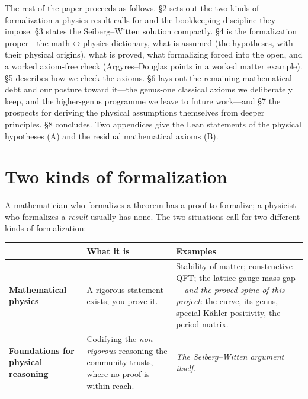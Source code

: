\documentclass{article}
\theoremstyle{plain}
\theoremstyle{definition}
\numberwithin{equation}{section}
\begin{document}
The rest of the paper proceeds as follows. \S2 sets out the two kinds of formalization a physics
result calls for and the bookkeeping discipline they impose. \S3 states the Seiberg--Witten solution
compactly. \S4 is the formalization proper---the math$\leftrightarrow$physics dictionary, what is assumed (the
hypotheses, with their physical origins), what is proved, what formalizing forced into the open, and a worked axiom-free check
(Argyres--Douglas points in a worked matter example).
\S5 describes how we check the axioms. \S6 lays out the remaining mathematical debt and our
posture toward it---the genus-one classical axioms we deliberately keep, and the higher-genus
programme we leave to future work---and \S7 the prospects for deriving the physical assumptions
themselves from deeper principles.
\S8 concludes. Two appendices give the Lean statements of the physical
hypotheses (A) and the residual mathematical axioms (B).

\section{Two kinds of formalization}

A mathematician who formalizes a theorem has a proof to formalize; a physicist who formalizes a
\emph{result} usually has none. The two situations call for two different kinds of formalization:

\begin{center}
\renewcommand{\arraystretch}{1.3}
\begin{tabular}{@{}p{}p{}p{}@{}}
\hline
& \textbf{What it is} & \textbf{Examples} \\
\hline
\textbf{Mathematical physics} & A rigorous statement exists; you prove it. & Stability of
matter; constructive QFT; the lattice-gauge mass gap---\emph{and the proved spine of this
project}: the curve, its genus, special-K\"ahler positivity, the period matrix. \\
\textbf{Foundations for physical reasoning} & Codifying the \emph{non-rigorous} reasoning the
community trusts, where no proof is within reach. &
\emph{The Seiberg--Witten argument itself.} \\
\hline
\end{tabular}
\end{center}
\end{document}
